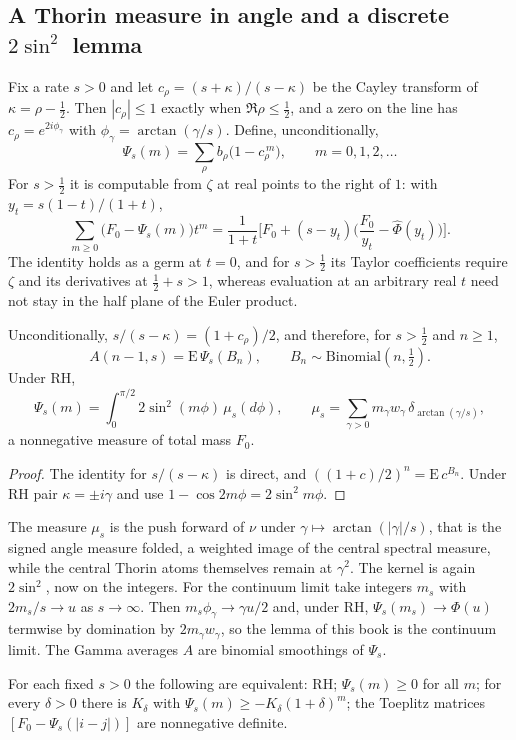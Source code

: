 \subsection{A Thorin measure in angle and a discrete \texorpdfstring{$2\sin^2$}{2 sin2} lemma}
Fix a rate $s>0$ and let $c_\rho=(s+\kappa)/(s-\kappa)$ be the Cayley transform of $\kappa=\rho-\tfrac12$. Then $|c_\rho|\le1$ exactly when $\Re\rho\le\tfrac12$, and a zero on the line has $c_\rho=e^{2i\phi_\gamma}$ with $\phi_\gamma=\arctan(\gamma/s)$. Define, unconditionally,
\[
\Psi_s(m)=\sum_\rho b_\rho\big(1-c_\rho^{\,m}\big),\qquad m=0,1,2,\dots
\]
For $s>\tfrac12$ it is computable from $\zeta$ at real points to the right of $1$: with $y_t=s(1-t)/(1+t)$,
\begin{equation}\label{st:eq:gen}
\sum_{m\ge0}\big(F_0-\Psi_s(m)\big)t^m=\frac1{1+t}\Big[F_0+(s-y_t)\Big(\frac {F_0}{y_t}-\hat\Phi(y_t)\Big)\Big].
\end{equation}
The identity holds as a germ at $t=0$, and for $s>\tfrac12$ its Taylor coefficients require $\zeta$ and its derivatives at $\tfrac12+s>1$, whereas evaluation at an arbitrary real $t$ need not stay in the half plane of the Euler product.
\begin{lemma}\label{st:lem:disc}
Unconditionally, $s/(s-\kappa)=(1+c_\rho)/2$, and therefore, for $s>\tfrac12$ and $n\ge1$,
\[
A(n-1,s)=\mathrm E\,\Psi_s(B_n),\qquad B_n\sim\mathrm{Binomial}(n,\tfrac12).
\]
Under RH,
\[
\Psi_s(m)=\int_0^{\pi/2}2\sin^2(m\phi)\,\mu_s(d\phi),\qquad \mu_s=\sum_{\gamma>0}m_\gamma w_\gamma\,\delta_{\arctan(\gamma/s)} ,
\]
a nonnegative measure of total mass $F_0$.
\end{lemma}
\begin{proof}
The identity for $s/(s-\kappa)$ is direct, and $((1+c)/2)^n=\mathrm E\,c^{B_n}$. Under RH pair $\kappa=\pm i\gamma$ and use $1-\cos2m\phi=2\sin^2m\phi$.
\end{proof}
The measure $\mu_s$ is the push forward of $\nu$ under $\gamma\mapsto\arctan(|\gamma|/s)$, that is the signed angle measure folded, a weighted image of the central spectral measure, while the central Thorin atoms themselves remain at $\gamma^2$. The kernel is again $2\sin^2$, now on the integers. For the continuum limit take integers $m_s$ with $2m_s/s\to u$ as $s\to\infty$. Then $m_s\phi_\gamma\to\gamma u/2$ and, under RH, $\Psi_s(m_s)\to\Phi(u)$ termwise by domination by $2m_\gamma w_\gamma$, so the lemma of this book is the continuum limit. The Gamma averages $A$ are binomial smoothings of $\Psi_s$.
\begin{theorem}\label{st:thm:li}
For each fixed $s>0$ the following are equivalent: RH; $\Psi_s(m)\ge0$ for all $m$; for every $\delta>0$ there is $K_\delta$ with $\Psi_s(m)\ge-K_\delta(1+\delta)^m$; the Toeplitz matrices $[F_0-\Psi_s(|i-j|)]$ are nonnegative definite.
\end{theorem}
